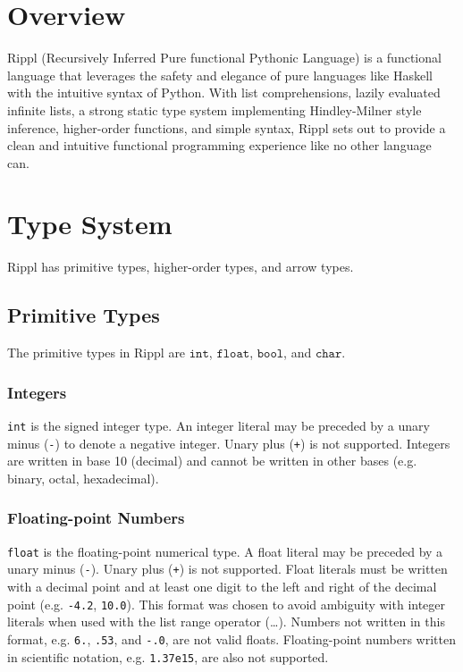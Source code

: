 \documentclass[5pt]{article}
\begin{document}
\pagebreak
\tableofcontents
\pagebreak
\section{Overview}
Rippl (Recursively Inferred Pure functional Pythonic Language) is a functional language that leverages the safety and elegance of pure languages like Haskell with the intuitive syntax of Python. With list comprehensions, lazily evaluated infinite lists, a strong static type system implementing Hindley-Milner style inference, higher-order functions, and simple syntax, Rippl sets out to provide a clean and intuitive functional programming experience like no other language can.

\section{Type System}
Rippl has primitive types, higher-order types, and arrow types.

\subsection{Primitive Types}
The primitive types in Rippl are $\texttt{int}$, $\texttt{float}$, $\texttt{bool}$, and $\texttt{char}$.
\subsubsection{Integers}
\texttt{int} is the signed integer type. An integer literal may be preceded by a unary minus (\texttt{-}) to denote a negative integer. Unary plus (\texttt{+}) is not supported. Integers are written in base 10 (decimal) and cannot be written in other bases (e.g. binary, octal, hexadecimal).

\subsubsection{Floating-point Numbers}
\texttt{float} is the floating-point numerical type. A float literal may be preceded by a unary minus (\texttt{-}). Unary plus (\texttt{+}) is not supported. Float literals must be written with a decimal point and at least one digit to the left and right of the decimal point (e.g. \texttt{-4.2}, \texttt{10.0}). This format was chosen to avoid ambiguity with integer literals when used with the list range operator (\dots). Numbers not written in this format, e.g. \texttt{6.}, \texttt{.53}, and \texttt{-.0}, are not valid floats. Floating-point numbers written in scientific notation, e.g. \texttt{1.37e15}, are also not supported.
\end{document}
